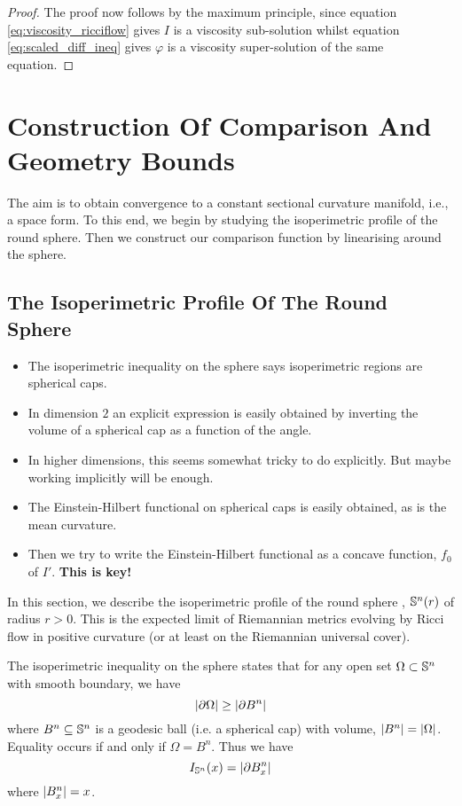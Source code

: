 \documentclass{amsart}
\begin{document}
\begin{proof}
The proof now follows by the maximum principle, since equation \eqref{eq:viscosity_ricciflow} gives \(I\) is a viscosity sub-solution whilst equation \eqref{eq:scaled_diff_ineq} gives \(\varphi\) is a viscosity super-solution of the same equation.
\end{proof}
\section{Construction Of Comparison And Geometry Bounds}

The aim is to obtain convergence to a constant sectional curvature manifold, i.e., a space form. To this end, we begin by studying the isoperimetric profile of the round sphere. Then we construct our comparison function by linearising around the sphere.

\subsection{The Isoperimetric Profile Of The Round Sphere}

\begin{itemize}
\item The isoperimetric inequality on the sphere says isoperimetric regions are spherical caps.
\item In dimension \(2\) an explicit expression is easily obtained by inverting the volume of a spherical cap as a function of the angle.
\item In higher dimensions, this seems somewhat tricky to do explicitly. But maybe working implicitly will be enough.
\item The Einstein-Hilbert functional on spherical caps is easily obtained, as is the mean curvature.
\item Then we try to write the Einstein-Hilbert functional as a concave function, \(f_0\) of \(I'\). \textbf{This is key!}
\end{itemize}

In this section, we describe the isoperimetric profile of the round sphere , \(\S^n(r)\) of radius \(r > 0\). This is the expected limit of Riemannian metrics evolving by Ricci flow in positive curvature (or at least on the Riemannian universal cover).

The isoperimetric inequality on the sphere states that for any open set \(\Omega \subset \S^n\) with smooth boundary, we have
\[
\abs{\bdry{\Omega}} \geq \abs{\bdry{B^n}}
\]
where \(B^n \subseteq \S^n\) is a geodesic ball (i.e. a spherical cap) with volume, \(\abs{B^n} = \abs{\Omega}\). Equality occurs if and only if \(\Omega = B^n\). Thus we have
\[
I_{\S^n} (x) = \abs{\bdry{B^n_x}}
\]
where \(\abs{B^n_x} = x\).
\end{document}
